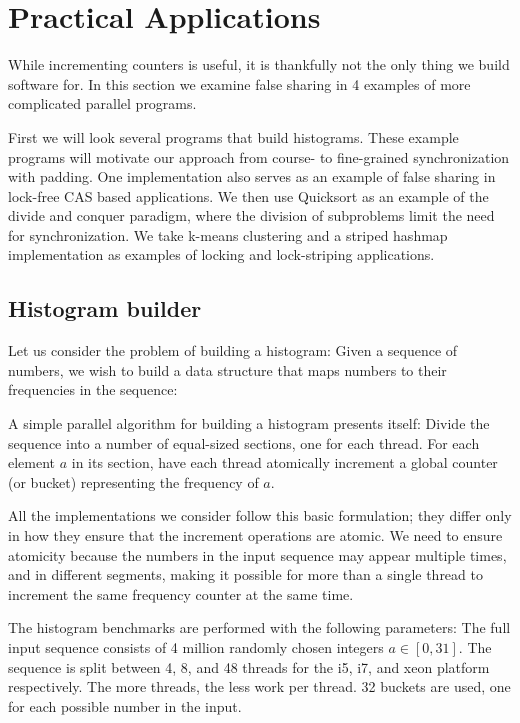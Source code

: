 

\section{Practical Applications}
While incrementing counters is useful, it is thankfully not the only thing we
build software for.
In this section we examine false sharing in 4  examples of more complicated parallel programs.

First we will look several programs that build histograms. These example
programs will motivate our approach from course- to fine-grained synchronization
with padding. One implementation also serves as an example of false sharing in
lock-free CAS based applications. We then use Quicksort as an example of the
divide and conquer paradigm, where the division of subproblems limit the need
for synchronization. We take k-means clustering and a striped hashmap
implementation as examples of locking and lock-striping applications.

\subsection{Histogram builder}

Let us consider the problem of building a histogram: Given a sequence of
numbers, we wish to build a data structure that maps numbers to their
frequencies in the sequence:

A simple parallel algorithm for building a histogram presents itself: Divide the
sequence into a number of equal-sized sections, one for each thread. For each
element $a$ in its section, have each thread atomically increment a global
counter (or bucket) representing the frequency of $a$.

All the implementations we consider follow this basic formulation; they differ
only in how they ensure that the increment operations are atomic. We need to
ensure atomicity because the numbers in the input sequence may appear multiple
times, and in different segments, making it possible for more than a single
thread to increment the same frequency counter at the same time.

The histogram benchmarks are performed with the following parameters: The full
input sequence consists of 4 million randomly chosen integers $a\in[0,31]$. The
sequence is split between 4, 8, and 48 threads for the i5, i7, and xeon platform
respectively. The more threads, the less work per thread. 32 buckets are used,
one for each possible number in the input.

